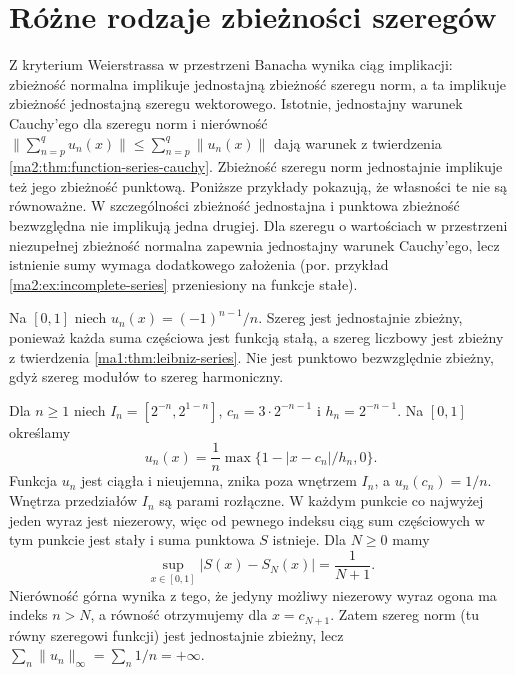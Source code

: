 \section{Różne rodzaje zbieżności szeregów}

Z kryterium Weierstrassa w przestrzeni Banacha
wynika ciąg implikacji:
zbieżność normalna implikuje jednostajną
zbieżność szeregu norm, a ta implikuje
zbieżność jednostajną szeregu wektorowego.
Istotnie, jednostajny warunek Cauchy'ego dla
szeregu norm i nierówność
$\|\sum_{n=p}^q u_n(x)\|\le\sum_{n=p}^q\|u_n(x)\|$
dają warunek z twierdzenia
\ref{ma2:thm:function-series-cauchy}.
Zbieżność szeregu norm jednostajnie implikuje
też jego zbieżność punktową.
Poniższe przykłady pokazują, że własności te
nie są równoważne. W szczególności zbieżność
jednostajna i punktowa zbieżność bezwzględna
nie implikują jedna drugiej. Dla szeregu o wartościach
w przestrzeni niezupełnej zbieżność normalna
zapewnia jednostajny warunek Cauchy'ego, lecz
istnienie sumy wymaga dodatkowego założenia
(por. przykład \ref{ma2:ex:incomplete-series}
przeniesiony na funkcje stałe).

\begin{przyklad}
\label{ma2:ex:uniform-nonnormal}
Na $[0,1]$ niech $u_n(x)=(-1)^{n-1}/n$.
Szereg jest jednostajnie zbieżny, ponieważ
każda suma częściowa jest funkcją stałą,
a szereg liczbowy jest zbieżny z twierdzenia
\ref{ma1:thm:leibniz-series}.
Nie jest punktowo bezwzględnie zbieżny,
gdyż szereg modułów to szereg harmoniczny.
\end{przyklad}

\begin{przyklad}
\label{ma2:ex:absolute-uniform-nonnormal}
Dla $n\ge1$ niech
$I_n=[2^{-n},2^{1-n}]$,
$c_n=3\cdot2^{-n-1}$ i $h_n=2^{-n-1}$.
Na $[0,1]$ określamy
\[
 u_n(x)=\frac1n\max\{1-|x-c_n|/h_n,0\}.
\]
Funkcja $u_n$ jest ciągła i nieujemna, znika poza
wnętrzem $I_n$, a $u_n(c_n)=1/n$.
Wnętrza przedziałów $I_n$ są parami rozłączne.
W każdym punkcie co najwyżej jeden wyraz jest
niezerowy, więc od pewnego indeksu ciąg sum
częściowych w tym punkcie jest stały i suma
punktowa $S$ istnieje.
Dla $N\ge0$ mamy
\[
 \sup_{x\in[0,1]}|S(x)-S_N(x)|=\frac1{N+1}.
\]
Nierówność górna wynika z tego, że jedyny możliwy
niezerowy wyraz ogona ma indeks $n>N$,
a równość otrzymujemy dla $x=c_{N+1}$.
Zatem szereg norm (tu równy szeregowi funkcji)
jest jednostajnie zbieżny, lecz
$\sum_n\|u_n\|_\infty=\sum_n1/n=+\infty$.
\end{przyklad}

